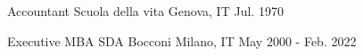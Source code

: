 
\begin{cventries}
    \cventrynodata
    {Accountant} %
    {Scuola della vita} %
    {Genova, IT} %
    {Jul. 1970} %
    {}

	\cventrynodata
	{Executive MBA} %
	{SDA Bocconi} %
	{Milano, IT} %
	{May 2000 - Feb. 2022} %
	{}
\end{cventries}
